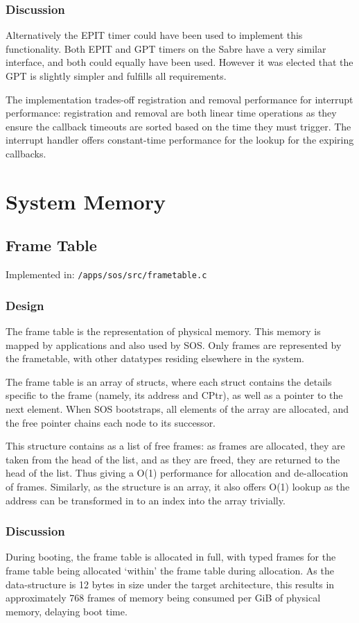 \documentclass[a4paper,12pt]{article}
\begin{document}
\subsubsection{Discussion}
Alternatively the EPIT timer could have been used to implement this
functionality.  Both EPIT and GPT timers on the Sabre have a very similar
interface, and both could equally have been used.  However it was elected that
the GPT is slightly simpler and fulfills all requirements.

The implementation trades-off registration and removal performance for
interrupt performance: registration and removal are both linear time
operations as they ensure the callback timeouts are sorted based on the time
they must trigger.  The interrupt handler offers constant-time performance for
the lookup for the expiring callbacks.

\section{System Memory}
\subsection{Frame Table}
Implemented in: \texttt{/apps/sos/src/frametable.c}
\subsubsection{Design}
The frame table is the representation of physical memory. This memory is
mapped by applications and also used by SOS.  Only frames are represented by
the frametable, with other datatypes residing elsewhere in the system.

The frame table is an array of structs, where each struct contains the details
specific to the frame (namely, its address and CPtr), as well as a pointer to
the next element.  When SOS bootstraps, all elements of the array are
allocated, and the free pointer chains each node to its successor.

This structure contains as a list of free frames: as frames are allocated,
they are taken from the head of the list, and as they are freed, they are
returned to the head of the list.  Thus giving a O(1) performance for
allocation and de-allocation of frames.  Similarly, as the structure is an
array, it also offers O(1) lookup as the address can be transformed in to an
index into the array trivially.

\subsubsection{Discussion}
During booting, the frame table is allocated in full, with typed frames for
the frame table being allocated `within' the frame table during allocation.
As the data-structure is 12 bytes in size under the target architecture, this
results in approximately 768 frames of memory being consumed per GiB of
physical memory, delaying boot time.
\end{document}
